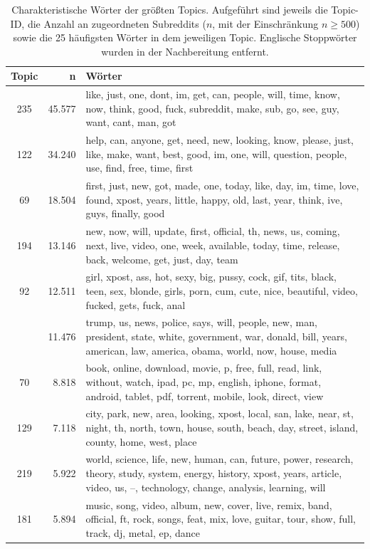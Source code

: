 \documentclass[11pt,a4paper,twoside]{article}
\begin{document}
\begin{longtable}[t]{cr >{\raggedright\arraybackslash}p{}}
\caption{\label{tab:app-top-words-tab}Charakteristische Wörter der größten Topics.
Aufgeführt sind jeweils die Topic-ID, die Anzahl an zugeordneten
Subreddits (\(n\), mit der Einschränkung \(n \ge 500\)) sowie die 25
häufigsten Wörter in dem jeweiligen Topic. Englische Stoppwörter wurden
in der Nachbereitung entfernt.}\\
\toprule
Topic & n & Wörter\\
\midrule\endhead
235 & 45.577 & like, just, one, dont, im, get, can, people, will, time, know, now, think, good, fuck, subreddit, make, sub, go, see, guy, want, cant, man, got\\
122 & 34.240 & help, can, anyone, get, need, new, looking, know, please, just, like, make, want, best, good, im, one, will, question, people, use, find, free, time, first\\
69 & 18.504 & first, just, new, got, made, one, today, like, day, im, time, love, found, xpost, years, little, happy, old, last, year, think, ive, guys, finally, good\\
194 & 13.146 & new, now, will, update, first, official, th, news, us, coming, next, live, video, one, week, available, today, time, release, back, welcome, get, just, day, team\\
92 & 12.511 & girl, xpost, ass, hot, sexy, big, pussy, cock, gif, tits, black, teen, sex, blonde, girls, porn, cum, cute, nice, beautiful, video, fucked, gets, fuck, anal\\
\addlinespace
210 & 11.476 & trump, us, news, police, says, will, people, new, man, president, state, white, government, war, donald, bill, years, american, law, america, obama, world, now, house, media\\
70 & 8.818 & book, online, download, movie, p, free, full, read, link, without, watch, ipad, pc, mp, english, iphone, format, android, tablet, pdf, torrent, mobile, look, direct, view\\
129 & 7.118 & city, park, new, area, looking, xpost, local, san, lake, near, st, night, th, north, town, house, south, beach, day, street, island, county, home, west, place\\
219 & 5.922 & world, science, life, new, human, can, future, power, research, theory, study, system, energy, history, xpost, years, article, video, us, –, technology, change, analysis, learning, will\\
181 & 5.894 & music, song, video, album, new, cover, live, remix, band, official, ft, rock, songs, feat, mix, love, guitar, tour, show, full, track, dj, metal, ep, dance\\

\end{longtable}
\end{document}
